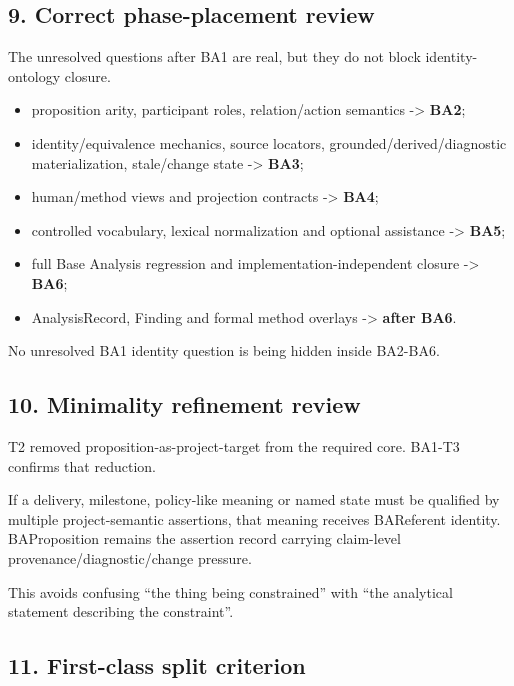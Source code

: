 \documentclass[
  10pt,
  a4paper,
]{article}
\providecommand{\tightlist}{%
  \setlength{\itemsep}{0pt}\setlength{\parskip}{0pt}}
\begin{document}
\subsection{9. Correct phase-placement
review}\label{correct-phase-placement-review}

The unresolved questions after BA1 are real, but they do not block
identity-ontology closure.

\begin{itemize}
\tightlist
\item
  proposition arity, participant roles, relation/action semantics
  -\textgreater{} \textbf{BA2};
\item
  identity/equivalence mechanics, source locators,
  grounded/derived/diagnostic materialization, stale/change state
  -\textgreater{} \textbf{BA3};
\item
  human/method views and projection contracts -\textgreater{}
  \textbf{BA4};
\item
  controlled vocabulary, lexical normalization and optional assistance
  -\textgreater{} \textbf{BA5};
\item
  full Base Analysis regression and implementation-independent closure
  -\textgreater{} \textbf{BA6};
\item
  AnalysisRecord, Finding and formal method overlays -\textgreater{}
  \textbf{after BA6}.
\end{itemize}

No unresolved BA1 identity question is being hidden inside BA2-BA6.

\subsection{10. Minimality refinement
review}\label{minimality-refinement-review}

T2 removed proposition-as-project-target from the required core. BA1-T3
confirms that reduction.

If a delivery, milestone, policy-like meaning or named state must be
qualified by multiple project-semantic assertions, that meaning receives
BAReferent identity. BAProposition remains the assertion record carrying
claim-level provenance/diagnostic/change pressure.

This avoids confusing ``the thing being constrained'' with ``the
analytical statement describing the constraint''.

\subsection{11. First-class split
criterion}\label{first-class-split-criterion}
\end{document}
